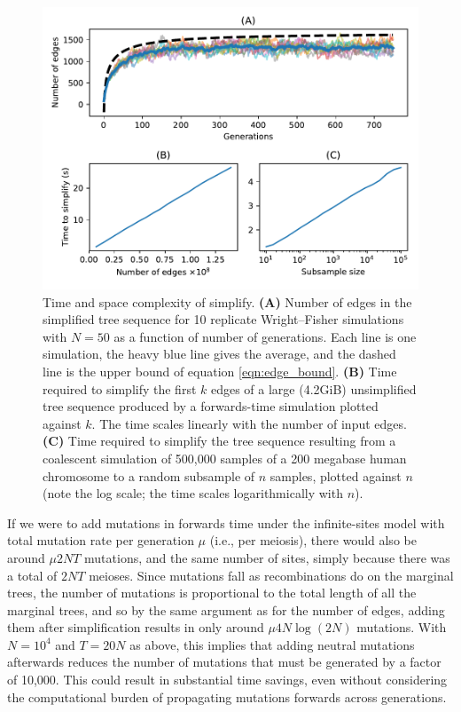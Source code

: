 \documentclass{article}
\begin{document}
\begin{figure}
    \begin{center}
        \includegraphics{sims/simplify-results}
    \end{center}
    \caption{
        Time and space complexity of simplify.
        \textbf{(A)}
        Number of edges in the simplified tree sequence
        for 10 replicate Wright--Fisher simulations with $N=50$ as a function
        of number of generations.
        Each line is one simulation, the heavy blue line gives the average,
        and the dashed line is the upper bound of equation \eqref{eqn:edge_bound}.
        \textbf{(B)}
        Time required to simplify the first $k$ edges of a large (4.2GiB)
        unsimplified tree sequence produced by a forwards-time simulation plotted
        against $k$. The time scales linearly with the number of input edges.
        \textbf{(C)}
        Time required to simplify the tree sequence resulting from a coalescent
        simulation of 500,000 samples of a 200 megabase human chromosome
        to a random subsample of $n$ samples, plotted against $n$
        (note the log scale; the time scales logarithmically with $n$).
        \label{fig:simplify_complexity}
    }
\end{figure}

If we were to add mutations in forwards time
under the infinite-sites model with total mutation rate per generation $\mu$ (i.e., per meiosis),
there would also be around $\mu 2NT$ mutations, and the same number of sites,
simply because there was a total of $2NT$ meioses.
Since mutations fall as recombinations do on the marginal trees,
the number of mutations is proportional to the total length of all the marginal trees,
and so by the same argument as for the number of edges,
adding them after simplification results in only around $\mu 4 N \log(2N)$ mutations.
With $N=10^4$ and $T=20N$ as above,
this implies that adding neutral mutations afterwards reduces the number of mutations that must be generated
by a factor of 10,000.
This could result in substantial time savings,
even without considering the
computational burden of propagating mutations forwards across generations.
\end{document}
